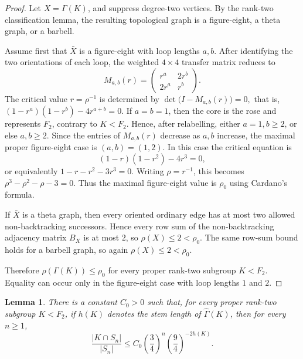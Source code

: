 \documentclass{amsproc}
\newtheorem{lemma}[theorem]{Lemma}
\begin{document}
\begin{proof}
Let $X=\Gamma(K)$, and suppress degree-two vertices.  By the rank-two
classification lemma, the resulting topological graph is a figure-eight, a
theta graph, or a barbell.

Assume first that $\bar X$ is a figure-eight with loop lengths $a,b$.
After identifying the two orientations of each loop, the weighted $4 \times 4$ transfer
matrix reduces to
\[
        M_{a,b}(r)=
        \begin{pmatrix}
                r^a & 2r^b \\
                2r^a & r^b
        \end{pmatrix}.
\]
The critical value $r=\rho^{-1}$ is determined by
$
        \det\bigl(I-M_{a,b}(r)\bigr)=0,
$
that is,
$
        (1-r^a)(1-r^b)-4r^{a+b}=0.
$
If $a=b=1$, then the core is the rose and represents $F_2$, contrary to
$K<F_2$.  Hence, after relabelling, either $a=1,b\geq 2$, or else $a,b\geq 2$.
Since the entries of $M_{a,b}(r)$ decrease as $a,b$ increase, the maximal proper
figure-eight case is $(a,b)=(1,2)$.  In this case the critical equation is
\[
        (1-r)(1-r^2)-4r^3=0,
\]
or equivalently
$
        1-r-r^2-3r^3=0.
$
Writing $\rho=r^{-1}$, this becomes
$
        \rho^3-\rho^2-\rho-3=0.
$
Thus the maximal figure-eight value is $\rho_0$ using Cardano's formula.

If $\bar X$ is a theta graph, then every oriented ordinary edge has at
most two allowed non-backtracking successors.  Hence every row sum of the
non-backtracking adjacency matrix $B_X$ is at most $2$, so
$
        \rho(X)\leq 2<\rho_0.
$
The same row-sum bound holds for a barbell graph, so again
$
        \rho(X)\leq 2<\rho_0.
$

Therefore $\rho(\Gamma(K))\leq \rho_0$ for every proper rank-two subgroup
$K<F_2$.  Equality can occur only in the figure-eight case with loop lengths
$1$ and $2$.
\end{proof}

\begin{lemma}\label{L.return}
There is a constant $C_0>0$ such that, for every proper rank-two subgroup
$K<F_2$, if $h(K)$ denotes the stem length of $\widehat\Gamma(K)$, then for
every $n\geq 1$,
\[
        \frac{|K\cap S_n|}{|S_n|}
        \leq C_0\left(\frac34\right)^n\left(\frac94\right)^{-2h(K)}.
\]
\end{lemma}
\end{document}
